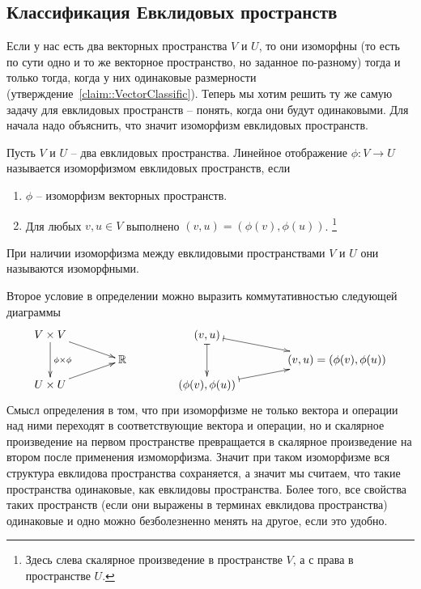 \subsection{Классификация Евклидовых пространств}

Если у нас есть два векторных пространства $V$ и $U$, то они изоморфны (то есть по сути одно и то же векторное пространство, но заданное по-разному) тогда и только тогда, когда у них одинаковые размерности (утверждение~\ref{claim::VectorClassific}).
Теперь мы хотим решить ту же самую задачу для евклидовых пространств -- понять, когда они будут одинаковыми.
Для начала надо объяснить, что значит изоморфизм евклидовых пространств.

\begin{definition}
Пусть $V$ и $U$ -- два евклидовых пространства.
Линейное отображение $\phi\colon V\to U$ называется изоморфизмом евклидовых пространств, если
\begin{enumerate}
\item $\phi$ -- изоморфизм векторных пространств.

\item Для любых $v,u\in V$ выполнено $(v, u) = (\phi(v), \phi(u))$.%
\footnote{Здесь слева скалярное произведение в пространстве $V$, а с права в пространстве $U$.}
\end{enumerate}
При наличии изоморфизма между евклидовыми пространствами $V$ и $U$ они называются изоморфными.
\end{definition}

Второе условие в определении можно выразить коммутативностью следующей диаграммы
\[
\xymatrix@R=6pt@C=40pt{
	{V\times V}\ar[dd]^{\phi\times \phi}\ar[rd]&{}&{(v,u)}\ar@{|->}[dd]\ar@{|->}[rd]&{}\\
	{}&{\mathbb R}&{}&{(v,u) = (\phi(v),\phi(u))}\\
	{U\times U}\ar[ru]&{}&{(\phi(v),\phi(u))}\ar@{|->}[ru]&{}
}
\]
Смысл определения в том, что при изоморфизме не только вектора и операции над ними переходят в соответствующие вектора и операции, но и скалярное произведение на первом пространстве превращается в скалярное произведение на втором после применения измоморфизма.
Значит при таком изоморфизме вся структура евклидова пространства сохраняется, а значит мы считаем, что такие пространства одинаковые, как евклидовы пространства.
Более того, все свойства таких пространств (если они выражены в терминах евклидова пространства) одинаковые и одно можно безболезненно менять на другое, если это удобно.


